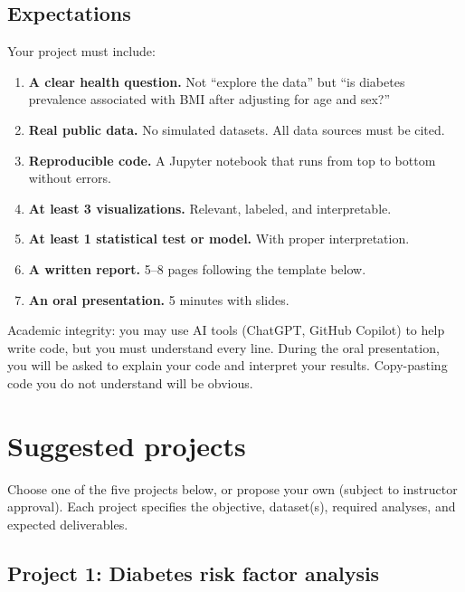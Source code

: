 \subsection{Expectations}

Your project must include:
\begin{enumerate}
  \item \textbf{A clear health question.} Not ``explore the data'' but ``is diabetes prevalence associated with BMI after adjusting for age and sex?''
  \item \textbf{Real public data.} No simulated datasets. All data sources must be cited.
  \item \textbf{Reproducible code.} A Jupyter notebook that runs from top to bottom without errors.
  \item \textbf{At least 3 visualizations.} Relevant, labeled, and interpretable.
  \item \textbf{At least 1 statistical test or model.} With proper interpretation.
  \item \textbf{A written report.} 5--8 pages following the template below.
  \item \textbf{An oral presentation.} 5 minutes with slides.
\end{enumerate}

\begin{warningbox}
Academic integrity: you may use AI tools (ChatGPT, GitHub Copilot) to help write code, but you must understand every line. During the oral presentation, you will be asked to explain your code and interpret your results. Copy-pasting code you do not understand will be obvious.
\end{warningbox}

\section{Suggested projects}

Choose one of the five projects below, or propose your own (subject to instructor approval). Each project specifies the objective, dataset(s), required analyses, and expected deliverables.

\subsection{Project 1: Diabetes risk factor analysis}

